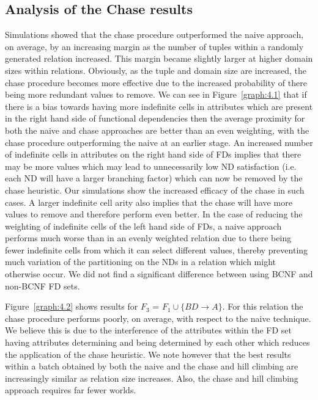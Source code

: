 \subsection{Analysis of the Chase results}
Simulations showed that the chase 
procedure outperformed
the naive approach, on average, by an increasing margin as the number of
tuples within a randomly generated relation increased. This margin became
slightly larger at higher domain sizes within relations. Obviously, as the
tuple and domain size are increased, the chase procedure becomes more 
effective due to the increased probability of there being more redundant 
values to remove. We can see in Figure~\ref{graph:4.1}
that if there is a bias towards having more indefinite cells in attributes
which are present in the right hand side of functional dependencies then
the average proximity for both the naive and chase approaches are better
than an even weighting, with the chase procedure outperforming the naive
at an earlier stage. An increased number of indefinite cells in attributes
on the right hand side of FDs implies that there may be more values which
may lead to unnecessarily low ND satisfaction (i.e. each ND will have a 
larger branching factor) which can now be removed by the chase heuristic.
Our simulations show the increased efficacy of the chase in such cases.
A larger indefinite cell arity also implies that the chase will have more
values to remove and therefore perform even better. In the case of reducing
the weighting of indefinite cells of the left hand side of FDs, a naive
approach performs much worse than in an evenly weighted relation due to
there being fewer indefinite cells from which it can select different
values, thereby preventing much variation of the partitioning on the NDs 
in a relation which might otherwise occur. We did not find a
significant difference between using BCNF and non-BCNF FD sets.

Figure~\ref{graph:4.2} shows results for
$F_3$ = $F_1 \cup \{ BD \to A \}$. For this relation
the chase procedure performs poorly, on average, with respect to the
naive technique. We believe this is due to the interference of the attributes
within the FD set having attributes determining and being determined by
each other which reduces the application of the chase heuristic.
 We note however that the best results within a batch obtained by both
the naive and the chase and hill climbing are increasingly similar as
relation size increases. Also, the chase and hill climbing approach requires
far fewer worlds.

